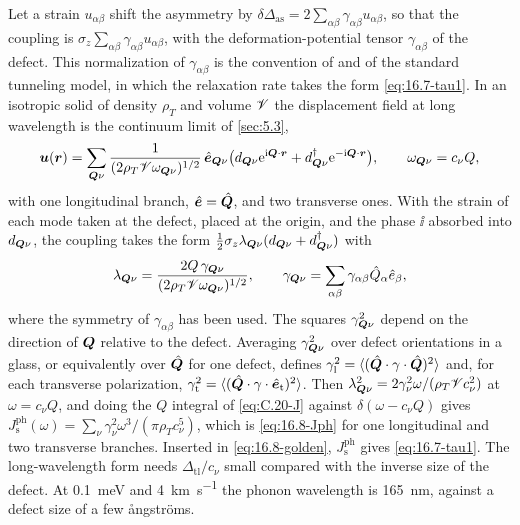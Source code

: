 Let a strain $u_{\alpha\beta}$ shift the asymmetry by $\delta\Delta_{\mathrm{as}} = 2\sum_{\alpha\beta}\gamma_{\alpha\beta}u_{\alpha\beta}$, so that the coupling is $\sigma_z\sum_{\alpha\beta}\gamma_{\alpha\beta}u_{\alpha\beta}$, with the deformation-potential tensor $\gamma_{\alpha\beta}$ of the defect. This normalization of $\gamma_{\alpha\beta}$ is the convention of \cite[Eq.~(16)]{muller2019towards} and of the standard tunneling model, in which the relaxation rate takes the form \cref{eq:16.7-tau1}. In an isotropic solid of density $\rho_T$ and volume $\mathscr{V}$ the displacement field at long wavelength is the continuum limit of \cref{sec:5.3},
\begin{equation*}
  \bm{u}(\bm{r}) = \sum_{\bm{Q}\nu}\frac{1}{(2\rho_T\mathscr{V}\omega_{\bm{Q}\nu})^{1/2}}\,\hat{\bm{e}}_{\bm{Q}\nu}\bigl(d_{\bm{Q}\nu}\mathrm{e}^{\mathrm{i}\bm{Q}\cdot\bm{r}} + d_{\bm{Q}\nu}^\dagger\mathrm{e}^{-\mathrm{i}\bm{Q}\cdot\bm{r}}\bigr) ,
  \qquad \omega_{\bm{Q}\nu} = c_\nu Q ,
\end{equation*}
with one longitudinal branch, $\hat{\bm{e}} = \hat{\bm{Q}}$, and two transverse ones. With the strain of each mode taken at the defect, placed at the origin, and the phase $\ii$ absorbed into $d_{\bm{Q}\nu}$, the coupling takes the form $\tfrac12\sigma_z\lambda_{\bm{Q}\nu}(d_{\bm{Q}\nu} + d_{\bm{Q}\nu}^\dagger)$ with
\begin{equation*}
  \lambda_{\bm{Q}\nu} = \frac{2Q\,\gamma_{\bm{Q}\nu}}{(2\rho_T\mathscr{V}\omega_{\bm{Q}\nu})^{1/2}} , \qquad
  \gamma_{\bm{Q}\nu} = \sum_{\alpha\beta}\gamma_{\alpha\beta}\hat Q_\alpha\hat e_\beta ,
\end{equation*}
where the symmetry of $\gamma_{\alpha\beta}$ has been used. The squares $\gamma_{\bm{Q}\nu}^2$ depend on the direction of $\bm{Q}$ relative to the defect. Averaging $\gamma_{\bm{Q}\nu}^2$ over defect orientations in a glass, or equivalently over $\hat{\bm{Q}}$ for one defect, defines $\gamma_{\mathrm{l}}^2 = \langle(\hat{\bm{Q}}\cdot\gamma\cdot\hat{\bm{Q}})^2\rangle$ and, for each transverse polarization, $\gamma_{\mathrm{t}}^2 = \langle(\hat{\bm{Q}}\cdot\gamma\cdot\hat{\bm{e}}_{\mathrm{t}})^2\rangle$. Then $\lambda_{\bm{Q}\nu}^2 = 2\gamma_\nu^2\omega/(\rho_T\mathscr{V} c_\nu^2)$ at $\omega = c_\nu Q$, and doing the $Q$ integral of \cref{eq:C.20-J} against $\delta(\omega - c_\nu Q)$ gives $J_{\mathrm{s}}^{\mathrm{ph}}(\omega) = \sum_\nu\gamma_\nu^2\omega^3/(\pi\rho_Tc_\nu^5)$, which is \cref{eq:16.8-Jph} for one longitudinal and two transverse branches. Inserted in \cref{eq:16.8-golden}, $J_{\mathrm{s}}^{\mathrm{ph}}$ gives \cref{eq:16.7-tau1}. The long-wavelength form needs $\Delta_{\mathrm{tl}}/c_\nu$ small compared with the inverse size of the defect. At \SI{0.1}{meV} and \SI{4}{km.s^{-1}} the phonon wavelength is \SI{165}{nm}, against a defect size of a few \r{a}ngstr\"oms.

